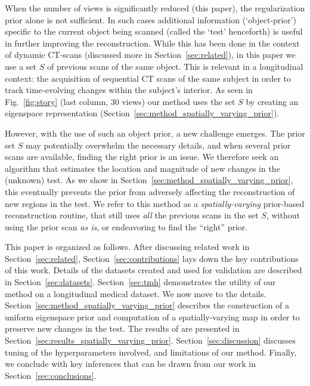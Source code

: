\documentclass[journal]{IEEEtran}
\begin{document}
 When the number of views is significantly reduced (this paper), the
 regularization prior alone is not sufficient.  In such cases additional
 information (`object-prior') specific to the current
 object being scanned (called the `test' henceforth) is useful in
 further improving the reconstruction.  While this has been done in
 the context of dynamic CT-scans (discussed more in
 Section~\ref{sec:related}), in this paper we use a set $S$ of
 previous scans of the same object. This is relevant in a longitudinal
 context: the acquisition of sequential CT scans of the same subject
 in order to track time-evolving changes within the subject's
 interior. As seen in Fig.~\ref{fig:story} (last column, 30 views) our
 method uses the set $S$ by creating an
 eigenspace representation (Section~\ref{sec:method_spatially_varying_prior}).

 However, with the use of such an object prior, a new challenge
 emerges. The prior set $S$ may potentially overwhelm the necessary
 details, and when several prior scans are available, finding the
 right prior is an issue. We therefore seek an algorithm that
 estimates the location and magnitude of new changes in the
 (unknown) test. As we show in
 Section~\ref{sec:method_spatially_varying_prior}, this eventually
 prevents the prior from adversely affecting the reconstruction of new
 regions in the test. We refer to this method as a
 \textit{spatially-varying} prior-based reconstruction routine, that
 still uses \textit{all} the previous scans in the set $S$, without
 using the prior scan \textit{as is}, or endeavoring to find the ``right''
 prior.

 This paper is organized as follows. After discussing related work in
 Section~\ref{sec:related}, Section~\ref{sec:contributions} lays down
 the key contributions of this work. Details of the datasets created and
 used for validation
 are described in Section~\ref{sec:datasets}. Section~\ref{sec:tmh}
 demonstrates the utility of our
 method on a longitudinal medical dataset. We now move to the
 details. Section~\ref{sec:method_spatially_varying_prior}
 describes the
 construction of a uniform eigenspace prior and computation of a spatially-varying map in order to preserve new changes in the test. 
 The results of are presented in
 Section~\ref{sec:results_spatially_varying_prior}. Section~\ref{sec:discussion}
 discusses tuning of the hyperparameters involved, and limitations of
 our method. Finally, we conclude with key inferences that can be
 drawn from our work in Section~\ref{sec:conclusions}.
 
\end{document}
